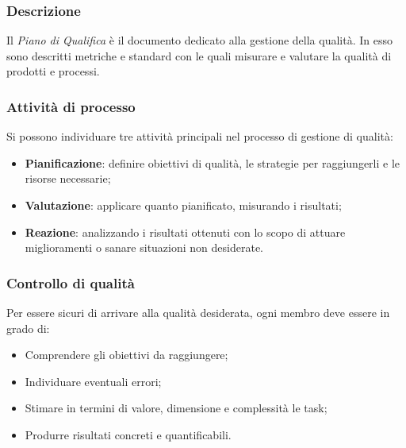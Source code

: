 \subsubsection{Descrizione}
Il \textit{Piano di Qualifica} è il documento dedicato alla gestione della qualità. In esso sono descritti metriche e standard con le quali misurare e valutare la qualità di prodotti e processi.  

\subsubsection{Attività di processo}
Si possono individuare tre attività principali nel processo di gestione di qualità:
\begin{itemize}
\item \textbf{Pianificazione}: definire obiettivi di qualità, le strategie per raggiungerli e le risorse necessarie; 
\item \textbf{Valutazione}: applicare quanto pianificato, misurando i risultati;
\item \textbf{Reazione}: analizzando i risultati ottenuti con lo scopo di attuare miglioramenti o sanare situazioni non desiderate.
\end{itemize}

\subsubsection{Controllo di qualità}
Per essere sicuri di arrivare alla qualità desiderata, ogni membro deve essere in grado di:
\begin{itemize}
\item Comprendere gli obiettivi da raggiungere;
\item Individuare eventuali errori;
\item Stimare in termini di valore, dimensione e complessità le task;
\item Produrre risultati concreti e quantificabili.
\end{itemize}

